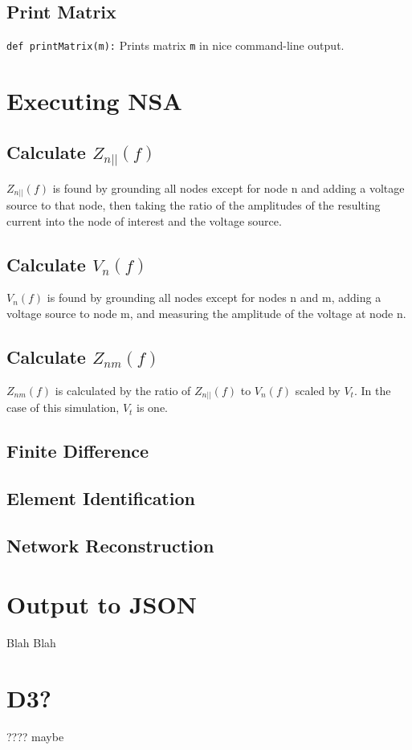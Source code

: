 \subsection{Print Matrix}
\texttt{def printMatrix(m):}
Prints matrix \texttt{m} in nice command-line output.

\section{Executing NSA}
\subsection{Calculate $Z_{n{||}}(f)$}
$Z_{n{||}}(f)$ is found by grounding all nodes except for node n and adding a voltage source to that node, then taking the ratio of the amplitudes of the resulting current into the node of interest and the voltage source.
\subsection{Calculate $V_n(f)$}
$V_n(f)$ is found by grounding all nodes except for nodes n and m, adding a voltage source to node m, and measuring the amplitude of the voltage at node n.
\subsection{Calculate $Z_{nm}(f)$}
$Z_{nm}(f)$ is calculated by the ratio of $Z_{n{||}}(f)$ to $V_n(f)$ scaled by $V_t$.
In the case of this simulation, $V_t$ is one.
\subsection{Finite Difference}

\subsection{Element Identification}

\subsection{Network Reconstruction}

\section{Output to JSON}
Blah Blah

\section{D3?}
???? maybe

%
